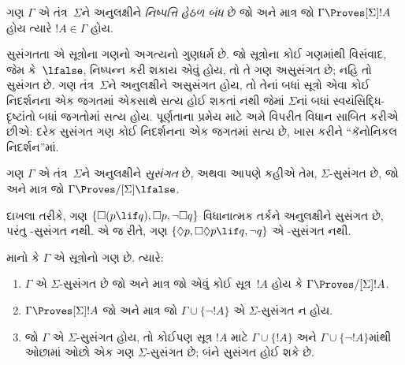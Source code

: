\begin{defn}
  ગણ $\Gamma$ એ તંત્ર~$\Sigma$ને અનુલક્ષીને \emph{નિષ્પત્તિ હેઠળ બંધ}
  છે જો અને માત્ર જો $\Gamma \Proves[\Sigma] !A$ હોય ત્યારે
  $!A \in \Gamma$ હોય.
\end{defn}
\endgroup

\begingroup
\makeatletter{}\makeatother


\label{guunit:OLP-0440}


સુસંગતતા એ સૂત્રોના ગણનો અગત્યનો ગુણધર્મ છે. જો સૂત્રોના કોઈ ગણમાંથી
વિસંવાદ, જેમ કે~$\lfalse$, નિષ્પન્ન કરી શકાય એવું હોય, તો તે ગણ અસુસંગત છે;
નહિ તો સુસંગત છે. ગણ તંત્ર~$\Sigma$ને અનુલક્ષીને અસુસંગત હોય,
તો તેનાં બધાં સૂત્રો એવા કોઈ નિદર્શનના એક જગતમાં એકસાથે
સત્ય હોઈ શકતાં નથી જેમાં $\Sigma$નાં બધાં સ્વયંસિદ્ધિ-દૃષ્ટાંતો
બધાં જગતોમાં સત્ય હોય. પૂર્ણતાના પ્રમેય માટે
અમે વિપરીત વિધાન સાબિત કરીએ છીએ: દરેક સુસંગત ગણ કોઈ નિદર્શનના એક
જગતમાં સત્ય છે, ખાસ કરીને ``કૅનોનિકલ નિદર્શન''માં.

\begin{defn}
  ગણ $\Gamma$ એ તંત્ર~$\Sigma$ને અનુલક્ષીને \emph{સુસંગત} છે, અથવા
  આપણે કહીએ તેમ, $\Sigma$-સુસંગત છે, જો અને માત્ર જો $\Gamma
  \Proves/[\Sigma] \lfalse$.
\end{defn}

દાખલા તરીકે, ગણ $\{ \Box(p \lif q), \Box p, \lnot\Box q \}$
વિધાનાત્મક તર્કને અનુલક્ષીને સુસંગત છે, પરંતુ -સુસંગત નથી.
એ જ રીતે, ગણ $\{ \Diamond p, \Box\Diamond
p \lif q, \lnot q \}$ એ -સુસંગત નથી.

\begin{prop}
  માનો કે $\Gamma$ એ સૂત્રોનો ગણ છે. ત્યારે:
  \begin{enumerate}
  \item $\Gamma$ એ $\Sigma$-સુસંગત છે જો અને માત્ર જો એવું કોઈ
    સૂત્ર~$!A$ હોય કે $\Gamma \Proves/[\Sigma]
    !A$.
  \item {}%
    $\Gamma \Proves[\Sigma] !A$ જો અને માત્ર જો $\Gamma \cup \{
    \lnot!A \}$ એ $\Sigma$-સુસંગત ન હોય.
  \item {}%
    જો $\Gamma$ એ $\Sigma$-સુસંગત હોય, તો કોઈપણ સૂત્ર
    $!A$ માટે $\Gamma \cup \{ !A \}$ અને
    $\Gamma \cup \{ \lnot!A \}$માંથી ઓછામાં ઓછો એક ગણ
    $\Sigma$-સુસંગત છે; બંને સુસંગત હોઈ શકે છે.
  \end{enumerate}
\end{prop}

